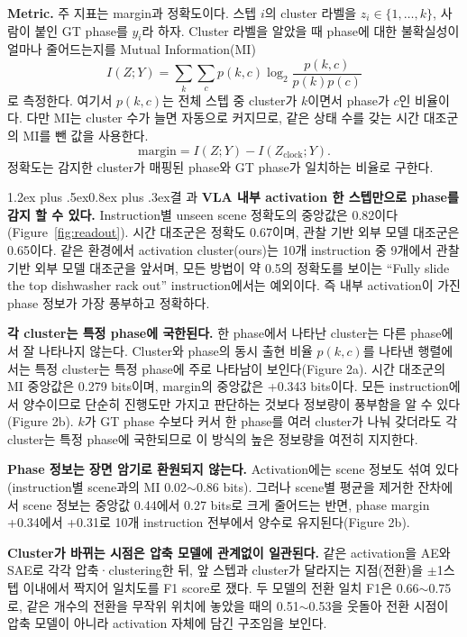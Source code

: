 \documentclass[a4paper,twocolumn,9pt]{extarticle}
\makeatletter
\renewcommand\section{\@startsection{section}{1}{\z@}%
  {1.2ex plus .5ex}{0.8ex plus .3ex}{\normalsize\bfseries}}
\makeatother
\begin{document}
\textbf{Metric.} 주 지표는 margin과 정확도이다. 스텝 $i$의 cluster 라벨을 $z_i \in \{1,\dots,k\}$, 사람이 붙인 GT phase를 $y_i$라 하자. Cluster 라벨을 알았을 때 phase에 대한 불확실성이 얼마나 줄어드는지를 Mutual Information(MI)
\begin{equation*}
I(Z;Y)=\sum_{k}\sum_{c} p(k,c)\log_2\frac{p(k,c)}{p(k)p(c)}
\end{equation*}
로 측정한다. 여기서 $p(k,c)$는 전체 스텝 중 cluster가 $k$이면서 phase가 $c$인 비율이다. 다만 MI는 cluster 수가 늘면 자동으로 커지므로, 같은 상태 수를 갖는 시간 대조군의 MI를 뺀 값을 사용한다.
\begin{equation}
\mathrm{margin} = I(Z;Y) - I(Z_{\mathrm{clock}};Y).
\label{eq:margin}
\end{equation}
정확도는 감지한 cluster가 매핑된 phase와 GT phase가 일치하는 비율로 구한다.

\section{결 과}
\textbf{VLA 내부 activation 한 스텝만으로 phase를 감지 할 수 있다.} Instruction별 unseen scene 정확도의 중앙값은 0.82이다(Figure~\ref{fig:readout}). 시간 대조군은 정확도 0.67이며, 관찰 기반 외부 모델 대조군\cite{egsae}은 0.65이다. 같은 환경에서 activation cluster(ours)는 10개 instruction 중 9개에서 관찰 기반 외부 모델 대조군을 앞서며, 모든 방법이 약 0.5의 정확도를 보이는 ``Fully slide the top dishwasher rack out'' instruction에서는 예외이다. 즉 내부 activation이 가진 phase 정보가 가장 풍부하고 정확하다.

\textbf{각 cluster는 특정 phase에 국한된다.} 한 phase에서 나타난 cluster는 다른 phase에서 잘 나타나지 않는다. Cluster와 phase의 동시 출현 비율 $p(k,c)$를 나타낸 행렬에서는 특정 cluster는 특정 phase에 주로 나타남이 보인다(Figure 2a). 시간 대조군의 MI 중앙값은 0.279 bits이며, margin의 중앙값은 +0.343 bits이다. 모든 instruction에서 양수이므로 단순히 진행도만 가지고 판단하는 것보다 정보량이 풍부함을 알 수 있다(Figure 2b). $k$가 GT phase 수보다 커서 한 phase를 여러 cluster가 나눠 갖더라도 각 cluster는 특정 phase에 국한되므로 이 방식의 높은 정보량을 여전히 지지한다.

\textbf{Phase 정보는 장면 암기로 환원되지 않는다.} Activation에는 scene 정보도 섞여 있다(instruction별 scene과의 MI 0.02$\sim$0.86 bits). 그러나 scene별 평균을 제거한 잔차에서 scene 정보는 중앙값 0.44에서 0.27 bits로 크게 줄어드는 반면, phase margin +0.34에서 +0.31로 10개 instruction 전부에서 양수로 유지된다(Figure 2b).

\textbf{Cluster가 바뀌는 시점은 압축 모델에 관계없이 일관된다.} 같은 activation을 AE와 SAE로 각각 압축·clustering한 뒤, 앞 스텝과 cluster가 달라지는 지점(전환)을 $\pm$1스텝 이내에서 짝지어 일치도를 F1 score로 쟀다. 두 모델의 전환 일치 F1은 0.66$\sim$0.75로, 같은 개수의 전환을 무작위 위치에 놓았을 때의 0.51$\sim$0.53을 웃돌아 전환 시점이 압축 모델이 아니라 activation 자체에 담긴 구조임을 보인다.
\end{document}
